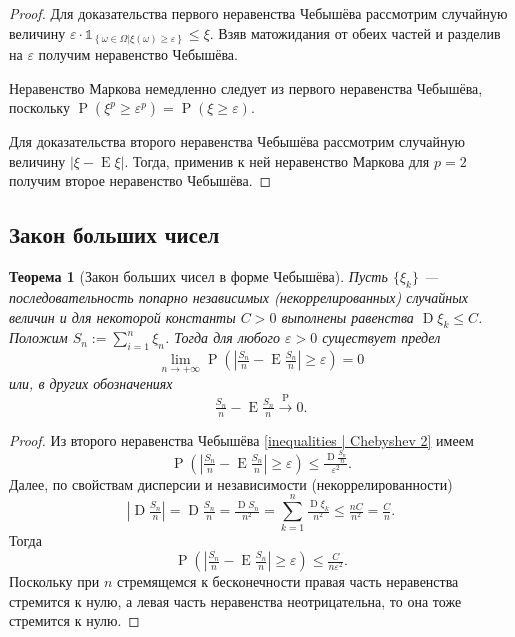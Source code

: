\documentclass[12pt]{article}
\newtheorem{theorem}{Теорема}
\numberwithin{theorem}{section}
\theoremstyle{definition}
\newcommand{\prob}{\operatorname{P}}
\newcommand{\expect}{\operatorname{E}}
\newcommand{\disp}{\operatorname{D}}
\newcommand{\ind}{\mathds{1}}
\newcommand{\defineset}[2]{\left\{
	\left.
	#1
	\right\vert
	#2
	\right\}}
\begin{document}
	\begin{proof}
		Для доказательства первого неравенства Чебышёва рассмотрим случайную величину 
		$ \varepsilon\cdot\ind_{\defineset{\omega \in \Omega}{\xi(\omega) \geqslant \varepsilon}} \leqslant \xi $.
		Взяв матожидания от обеих частей и разделив на $ \varepsilon $ получим неравенство Чебышёва.
		
		Неравенство Маркова немедленно следует из первого неравенства Чебышёва,
		поскольку $ \prob(\xi^p \geqslant \varepsilon^p) = \prob(\xi \geqslant \varepsilon) $.
		
		Для доказательства второго неравенства Чебышёва рассмотрим случайную величину $ |\xi - \expect\xi| $.
		Тогда, применив к ней неравенство Маркова для $ p = 2 $ получим второе неравенство Чебышёва.
	\end{proof}
	
	\subsection{Закон больших чисел}
	
	\begin{theorem}[Закон больших чисел в форме Чебышёва] \label{large numbes law | Chebishov}
		Пусть $ \{\xi_k\} $ --- последовательность попарно независимых (некоррелированных)
		случайных величин и для некоторой константы $ C > 0 $ выполнены равенства
		$ \disp\xi_k \leqslant C $. Положим $ S_n := \sum\limits_{i = 1}^{n} \xi_n $.
		Тогда для любого $ \varepsilon > 0 $ существует предел
		$$ \lim\limits_{n \to +\infty} \prob(|\tfrac{S_n}{n} - \expect\tfrac{S_n}{n}| \geqslant \varepsilon) = 0 $$ 
		или, в других обозначениях 
		$$ \tfrac{S_n}{n} - \expect\tfrac{S_n}{n} \overset{\prob}{\to} 0. $$
	\end{theorem}
	
	\begin{proof}
		Из второго неравенства Чебышёва \ref{inequalities | Chebyshev 2} имеем
		$$ \prob(|\tfrac{S_n}{n} - \expect\tfrac{S_n}{n}| \geqslant \varepsilon) \leqslant \tfrac{\disp\tfrac{S_n}{n}}{\varepsilon^2}. $$
		Далее, по свойствам дисперсии и независимости (некоррелированности)
		$$ |\disp\tfrac{S_n}{n}| = \disp\tfrac{S_n}{n} = \tfrac{\disp S_n}{n^2} = \sum\limits_{k = 1}^{n} \tfrac{\disp\xi_k}{n^2}
		\leqslant \tfrac{nC}{n^2} = \tfrac{C}{n}. $$
		Тогда
		$$ \prob(|\tfrac{S_n}{n} - \expect\tfrac{S_n}{n}| \geqslant \varepsilon) \leqslant \tfrac{C}{n\varepsilon^2}. $$
		Поскольку при $ n $ стремящемся к бесконечности правая часть неравенства стремится к нулю,
		а левая часть неравенства неотрицательна, то она тоже стремится к нулю.
	\end{proof}
	
\end{document}
